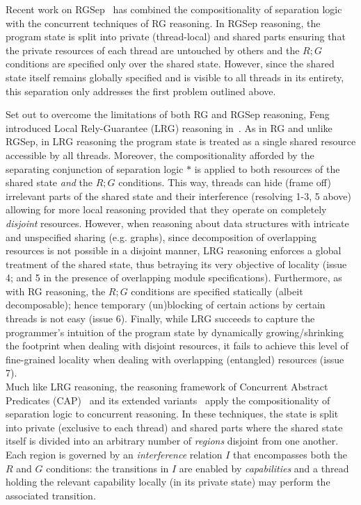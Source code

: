 %
%
%
Recent work on RGSep~\cite{viktor-marriage} has combined the compositionality of separation logic~\cite{seplog,csl-tcs} with the concurrent techniques of RG reasoning. In RGSep reasoning, the program state is split into private (thread-local) and shared parts ensuring that the private resources of each thread are untouched by others and the $R;G$ conditions are specified only over the shared state. However, since the shared state itself remains globally specified and is visible to all threads in its entirety, this separation only addresses the first problem outlined above.

%
Set out to overcome the limitations of both RG and RGSep reasoning, Feng introduced Local Rely-Guarantee (LRG) reasoning in~\cite{lrg}. As in RG and unlike RGSep, in LRG reasoning the program state is treated as a single shared resource accessible by all threads. Moreover, the compositionality afforded by the separating conjunction of separation logic $*$ is applied to both resources of the shared state \emph{and} the $R;G$ conditions. This way, threads can hide (frame off) irrelevant parts of the shared state and their interference (resolving 1-3, 5 above) allowing for more local reasoning provided that they operate on completely \emph{disjoint} resources. However, when reasoning about data structures with intricate and unspecified sharing (e.g. graphs), since decomposition of overlapping resources is not possible in a disjoint manner, LRG reasoning enforces a global treatment of the shared state, thus betraying its very objective of locality (issue 4; and 5 in the presence of overlapping module specifications). Furthermore, as with RG reasoning, the $R;G$ conditions are specified statically (albeit decomposable); hence temporary (un)blocking of certain actions by certain threads is not easy (issue 6). Finally, while LRG succeeds to capture the programmer's intuition of the program state by dynamically growing/shrinking the footprint when dealing with disjoint resources, it fails to achieve this level of fine-grained locality when dealing with overlapping (entangled) resources (issue 7).\\
%
\indent Much like LRG reasoning, the reasoning framework of Concurrent Abstract Predicates (CAP)~\cite{cap-ecoop10} and its extended variants~\cite{icap,tada} apply the compositionality of separation logic to concurrent reasoning. In these techniques, the state is split into private (exclusive to each thread) and shared parts where the shared state itself is divided into an arbitrary number of \emph{regions} disjoint from one another. Each region is governed by an \emph{interference} relation $I$ that encompasses both the $R$ and $G$ conditions: the transitions in $I$ are enabled by \emph{capabilities} and a thread holding the relevant capability locally (in its private state) may perform the associated transition. 

